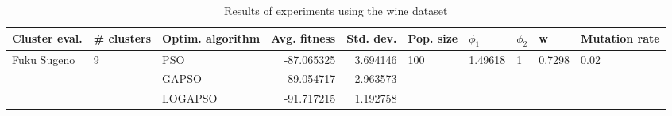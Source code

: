 \begin{table}
\centering
\caption{Results of experiments using the wine dataset}
\begin{tabular}{lllrrlllll}
\toprule
               Cluster eval. &        \# clusters & Optim. algorithm &  Avg. fitness &  Std. dev. &            Pop. size &               $\phi_{1}$ &         $\phi_{2}$ &                       w &         Mutation rate \\
\midrule
\multirow{3}{*}{Fuku Sugeno} & \multirow{3}{*}{9} &              PSO &    -87.065325 &   3.694146 & \multirow{3}{*}{100} & \multirow{3}{*}{1.49618} & \multirow{3}{*}{1} & \multirow{3}{*}{0.7298} & \multirow{3}{*}{0.02} \\
                             &                    &            GAPSO &    -89.054717 &   2.963573 &                      &                          &                    &                         &                       \\
                             &                    &          LOGAPSO &    -91.717215 &   1.192758 &                      &                          &                    &                         &                       \\
\bottomrule
\end{tabular}
\end{table}
